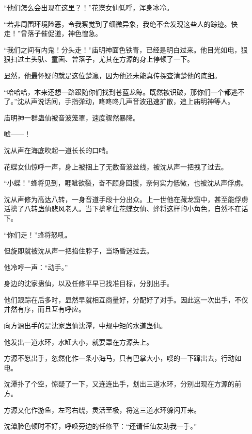 
\begin{this_body}



“他们怎么会出现在这里？！”花蝶女仙低呼，浑身冰冷。

“若非周围环境险恶，令我察觉到了细微异象，我绝不会发现这些人的踪迹。快走！”曾落子催促道，神色惶急。

“我们之间有内鬼！分头走！”庙明神面色铁青，已经是明白过来。他目光如电，狠狠扫过土头驮、童画、曾落子，尤其在方源的身上停顿了一下。

显然，他最怀疑的就是这位楚瀛，因为他还未能真传探查清楚他的底细。

“哈哈哈，本来还想一路跟随你们找到苍蓝龙鲸。既然被识破，那你们一个都逃不了。”沈从声说话间，手指弹动，咚咚咚几声音波迅速扩散，追上庙明神等人。

庙明神一群蛊仙被音波笼罩，速度骤然暴降。

嘘——！

沈从声在海底吹起一道长长的口哨。

花蝶女仙惊呼一声，身上被捆上了无数音波丝线，被沈从声一把拽了过去。

“小蝶！”蜂将见到，睚眦欲裂，奋不顾身回援，奈何实力低微，也被沈从声俘虏。

沈从声修为高达八转，一身音道手段十分出众。上一世他在藏龙窟中，甚至能俘虏活擒了八转蛊仙悲风老人。当下擒拿住花蝶女仙、蜂将这样的小角色，自然不在话下。

“你们走！”蜂将怒吼。

但旋即就被沈从声一把掐住脖子，当场昏迷过去。

他冷哼一声：“动手。”

身边的沈家蛊仙，以及任修平早已找准目标，分别出手。

他们跟踪在后多时，显然早就相互商量好，分配好了对手。因此这一次出手，不仅井然有序，而且互有呼应。

向方源出手的是沈家蛊仙沈潭，中规中矩的水道蛊仙。

他发出一道水环，水缸大小，就要罩在方源头上。

方源不愿出手，忽然化作一条小海马，只有巴掌大小，嗖的一下蹿出去，行动如电。

沈潭扑了个空，惊疑了一下，又连连出手，划出三道水环，分别出现在方源的前方。

方源又化作游鱼，左弯右绕，灵活至极，将这三道水环躲闪开来。

沈潭脸色顿时不好，呼唤旁边的任修平：“还请任仙友助我一手。”


\end{this_body}
